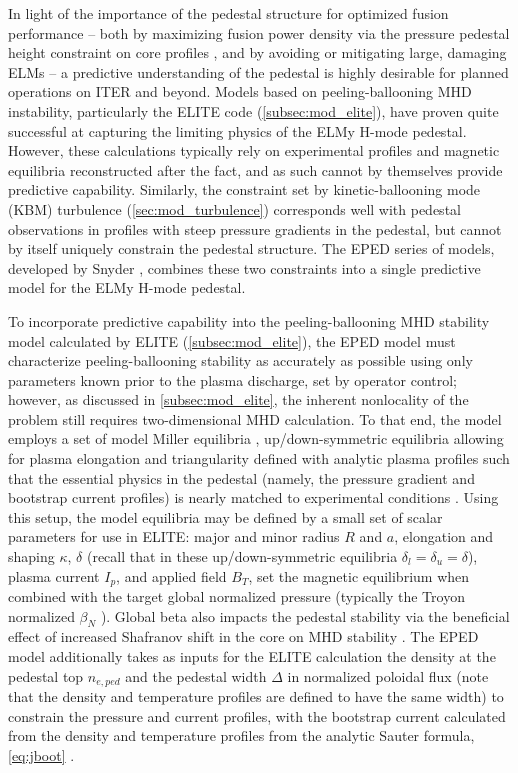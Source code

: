 In light of the importance of the pedestal structure for optimized fusion performance -- both by maximizing fusion power density via the pressure pedestal height constraint on core profiles \cite{Kinsey2011}, and by avoiding or mitigating large, damaging ELMs \cite{Loarte2003,Federici2003} -- a predictive understanding of the pedestal is highly desirable for planned operations on ITER and beyond.  Models based on peeling-ballooning MHD instability, particularly the ELITE code (\cref{subsec:mod_elite}), have proven quite successful at capturing the limiting physics of the ELMy H-mode pedestal.  However, these calculations typically rely on experimental profiles and magnetic equilibria reconstructed after the fact, and as such cannot by themselves provide predictive capability.  Similarly, the constraint set by kinetic-ballooning mode (KBM) turbulence (\cref{sec:mod_turbulence}) corresponds well with pedestal observations in profiles with steep pressure gradients in the pedestal, but cannot by itself uniquely constrain the pedestal structure.  The EPED series of models, developed by Snyder \etal \cite{Snyder2011}, combines these two constraints into a single predictive model for the ELMy H-mode pedestal.

To incorporate predictive capability into the peeling-ballooning MHD stability model calculated by ELITE (\cref{subsec:mod_elite}), the EPED model must characterize peeling-ballooning stability as accurately as possible using only parameters known prior to the plasma discharge, set by operator control; however, as discussed in \cref{subsec:mod_elite}, the inherent nonlocality of the problem still requires two-dimensional MHD calculation.  To that end, the model employs a set of model Miller equilibria \cite{Miller1998}, up/down-symmetric equilibria allowing for plasma elongation and triangularity defined with analytic plasma profiles such that the essential physics in the pedestal (namely, the pressure gradient and bootstrap current profiles) is nearly matched to experimental conditions \cite{Snyder2009}.  Using this setup, the model equilibria may be defined by a small set of scalar parameters for use in ELITE: major and minor radius $R$ and $a$, elongation and shaping $\kappa$, $\delta$ (recall that in these up/down-symmetric equilibria $\delta_l = \delta_u = \delta$), plasma current $I_p$, and applied field $B_T$, set the magnetic equilibrium when combined with the target global normalized pressure (typically the Troyon normalized $\beta_N$ \cite{Troyon1984}).  Global beta also impacts the pedestal stability via the beneficial effect of increased Shafranov shift in the core on MHD stability \cite{Snyder2007}.  The EPED model additionally takes as inputs for the ELITE calculation the density at the pedestal top $n_{e,ped}$ and the pedestal width $\Delta$ in normalized poloidal flux (note that the density and temperature profiles are defined to have the same width) to constrain the pressure and current profiles, with the bootstrap current calculated from the density and temperature profiles from the analytic Sauter formula, \cref{eq:jboot} \cite{Sauter1999}.

